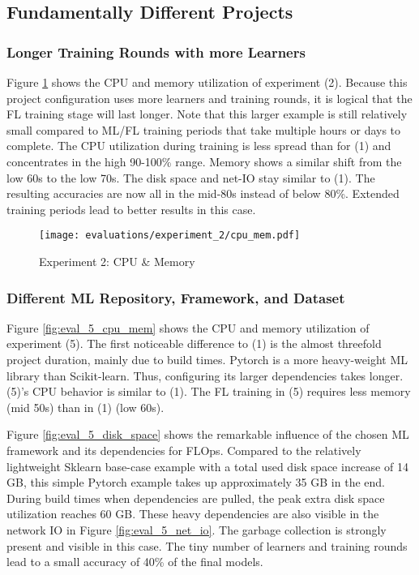 \subsection{Fundamentally Different Projects} \label{subsection:eval_diff_projects}

\subsubsection{Longer Training Rounds with more Learners}

Figure \ref{fig:eval_2_cpu_mem} shows the CPU and memory utilization of experiment (2).
Because this project configuration uses more learners and training rounds, it is logical that the FL training stage will last longer.
Note that this larger example is still relatively small compared to ML/FL training periods that take multiple hours or days to complete.
The CPU utilization during training is less spread than for (1) and concentrates in the high 90-100\% range.
Memory shows a similar shift from the low 60s to the low 70s.
The disk space and net-IO stay similar to (1).
The resulting accuracies are now all in the mid-80s instead of below 80\%.
Extended training periods lead to better results in this case.

\begin{figure}[t]
    \begin{adjustwidth}{-0.2\paperwidth}{-0.2\paperwidth}
        \centering
        \texttt{[image: evaluations/experiment\_2/cpu\_mem.pdf]}
        \caption{Experiment 2: CPU \& Memory}
        \label{fig:eval_2_cpu_mem}
    \end{adjustwidth}
\end{figure}

\subsubsection{Different ML Repository, Framework, and Dataset}
Figure \ref{fig:eval_5_cpu_mem} shows the CPU and memory utilization of experiment (5).
The first noticeable difference to (1) is the almost threefold project duration, mainly due to build times.
Pytorch is a more heavy-weight ML library than Scikit-learn.
Thus, configuring its larger dependencies takes longer.
(5)'s CPU behavior is similar to (1).
The FL training in (5) requires less memory (mid 50s) than in (1) (low 60s).

Figure \ref{fig:eval_5_disk_space} shows the remarkable influence of the chosen ML framework and its dependencies for FLOps.
Compared to the relatively lightweight Sklearn base-case example with a total used disk space increase of 14 GB, this simple Pytorch example takes up approximately 35 GB in the end.
During build times when dependencies are pulled, the peak extra disk space utilization reaches 60 GB.
These heavy dependencies are also visible in the network IO in Figure \ref{fig:eval_5_net_io}.
The garbage collection is strongly present and visible in this case.
The tiny number of learners and training rounds lead to a small accuracy of 40\% of the final models.

